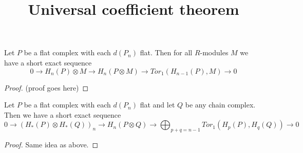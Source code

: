\documentclass{ximera}
\title{Universal coefficient theorem}
\begin{document}
\begin{abstract}
  
\end{abstract}
\maketitle

\begin{theorem}
  Let $P$ be a flat complex with each $d(P_n)$ flat.  Then for all
  $R$-modules $M$ we have a short exact sequence
  \[
  0 \rightarrow H_n(P) \otimes M 
  \rightarrow H_n(P \otimes M)
  \rightarrow Tor_1(H_{n-1}(P), M) \rightarrow 0
  \]
\end{theorem}
\begin{proof}
  (proof goes here)
\end{proof}

\begin{theorem}
  Let $P$ be a flat complex with each $d(P_n)$ flat and let $Q$ be any
  chain complex.  Then we have a short exact sequence
  \[
  0 \rightarrow (H_*(P) \otimes H_*(Q))_n 
  \rightarrow H_n(P \otimes Q)
  \rightarrow \bigoplus_{p+q = n-1}Tor_1(H_{p}(P), H_q(Q)) \rightarrow 0
  \]
\end{theorem}
\begin{proof}
  Same idea as above.
\end{proof}
\end{document}
